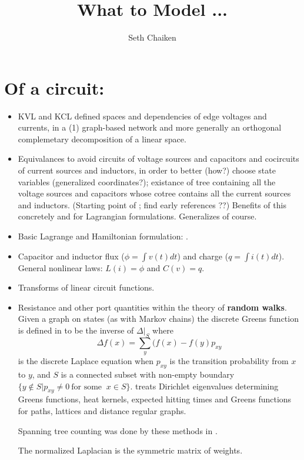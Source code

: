 \documentclass{article}
\title{What to Model ... }
\author{Seth Chaiken}
\begin{document}
\maketitle

\section{Of a circuit:}
\begin{itemize}
\item KVL and KCL defined spaces and dependencies of edge voltages and currents,
in a (1) graph-based network and more generally an orthogonal complemetary
decomposition of a linear space.
\item Equivalances to avoid circuits of voltage sources and capacitors
and cocircuits of current sources and inductors, in order to better (how?)
choose state variables (generalized coordinates?); existance of tree containing
all the voltage sources and capacitors whose cotree contains all the 
current sources and inductors.    (Starting point
of \cite{ChuaMcPhersonLagrange}; find early references ??)
Benefits of this concretely and for Lagrangian formulations.
Generalizes of course.
\item Basic Lagrange and Hamiltonian formulation: 
\cite{ChuaMcPhersonLagrange}.
\item Capacitor and inductor flux ($\phi = \int v(t) dt$) and
charge ($q = \int i(t) dt$).
General nonlinear laws: $L(i) = \phi$ and $C(v) = q$.
\item Transforms of linear circuit functions.
\item Resistance and other port quantities within the theory of 
\textbf{random walks}\cite{DoyleSnellRandom,ProbOnTreesNetworks}.
Given a graph on states (as with Markov chains)
the discrete Greens function is defined
in \cite{ChungYaoDiscreteGreensFn}
to be the inverse of $\Delta|_S$  where
\[
\Delta f(x)=\sum_y(f(x)-f(y)p_{xy}
\]
is the discrete Laplace equation
when $p_{xy}$ is the transition probability from $x$ to $y$, and
$S$ is a connected subset with non-empty boundary
$\{y\not\in S | p_{xy}\not= 0 \ \text{for some }\ x\in S\}$.
\cite{ChungYaoDiscreteGreensFn} treats Dirichlet eigenvalues
determining Greens functions,
heat kernels, expected hitting times
and Greens functions for paths, lattices and distance regular graphs.  

  Spanning tree counting was done by these methods in
  \cite{ChungYaoCovHeatKSpTrees}.

  The normalized Laplacian is the symmetric matrix of weights.




\end{itemize}
\end{document}
